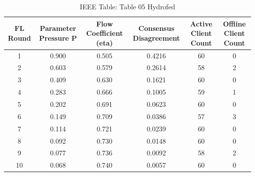 \begin{table}[htbp]
\caption{IEEE Table: Table 05 Hydrofed}
\label{tab:table_05_hydrofed}
\centering
\begin{tabular}{|c|c|c|c|c|c|}
\hline
FL Round & Parameter Pressure P & Flow Coefficient (eta) & Consensus Disagreement & Active Client Count & Offline Client Count \\
\hline\hline
1 & 0.900 & 0.505 & 0.4216 & 60 & 0 \\
\hline
2 & 0.603 & 0.579 & 0.2614 & 58 & 2 \\
\hline
3 & 0.409 & 0.630 & 0.1621 & 60 & 0 \\
\hline
4 & 0.283 & 0.666 & 0.1005 & 59 & 1 \\
\hline
5 & 0.202 & 0.691 & 0.0623 & 60 & 0 \\
\hline
6 & 0.149 & 0.709 & 0.0386 & 57 & 3 \\
\hline
7 & 0.114 & 0.721 & 0.0239 & 60 & 0 \\
\hline
8 & 0.092 & 0.730 & 0.0148 & 60 & 0 \\
\hline
9 & 0.077 & 0.736 & 0.0092 & 58 & 2 \\
\hline
10 & 0.068 & 0.740 & 0.0057 & 60 & 0 \\
\hline
\end{tabular}
\end{table}
